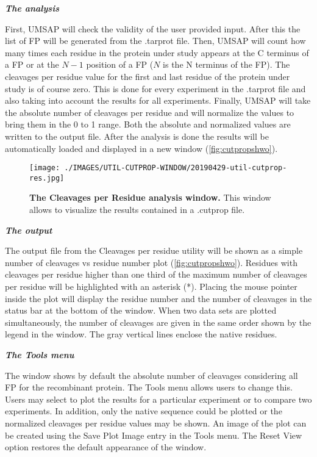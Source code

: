 \textit{\textbf{The analysis}}

First, UMSAP will check the validity of the user provided input. After this the list of FP will be generated from the .tarprot file. Then, UMSAP will count how many times each residue in the protein under study appears at the C terminus of a FP or at the \(N-1\) position of a FP (\(N\) is the N terminus of the FP). The cleavages per residue value for the first and last residue of the protein under study is of course zero. This is done for every experiment in the .tarprot file and also taking into account the results for all experiments. Finally, UMSAP will take the absolute number of cleavages per residue and will normalize the values to bring them in the 0 to 1 range. Both the absolute and normalized values are written to the output file. After the analysis is done the results will be automatically loaded and displayed in a new window (\autoref{fig:cutpropshwo}). 

\begin{figure}[h]
	\centering
	\texttt{[image: ./IMAGES/UTIL-CUTPROP-WINDOW/20190429-util-cutprop-res.jpg]}	    
	\caption[The Cleavages per Residue analysis window]{\textbf{The Cleavages per Residue analysis window.} This window allows to visualize the results contained in a .cutprop file.} 
	\label{fig:cutpropshwo}
	\vspace{-5pt} 	
\end{figure}
\newpage
\textit{\textbf{The output}}

The output file from the Cleavages per residue utility will be shown as a simple number of cleavages vs residue number plot (\autoref{fig:cutpropshwo}). Residues with cleavages per residue higher than one third of the maximum number of cleavages per residue will be highlighted with an asterisk (*). Placing the mouse pointer inside the plot will display the residue number and the number of cleavages in the status bar at the bottom of the window. When two data sets are plotted simultaneously, the number of cleavages are given in the same order shown by the legend in the window. The gray vertical lines enclose the native residues. 

\textit{\textbf{The Tools menu}}

The window shows by default the absolute number of cleavages considering all FP for the recombinant protein. The Tools menu allows users to change this. Users may select to plot the results for a particular experiment or to compare two experiments. In addition, only the native sequence could be plotted or the normalized cleavages per residue values may be shown. An image of the plot can be created using the Save Plot Image entry in the Tools menu. The Reset View option restores the default appearance of the window.   

